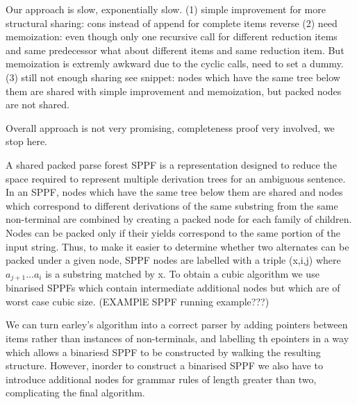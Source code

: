 \begin{isabellebody}
\begin{isamarkuptext}
Our approach is slow, exponentially slow.
(1) simple improvement for more structural sharing: cons instead of append for complete items reverse
(2) need memoization: even though only one recursive call for different reduction items and same
  predecessor what about different items and same reduction item. But memoization is extremly awkward
  due to the cyclic calls, need to set a dummy.
(3) still not enough sharing see snippet: nodes which have the same tree below them are shared with
  simple improvement and memoization, but packed nodes are not shared.

Overall approach is not very promising, completeness proof very involved, we stop here.%
\end{isamarkuptext}\isamarkuptrue%
%
\begin{isamarkuptext}%
A shared packed parse forest SPPF is a representation designed to reduce the space required to represent multiple derivation
trees for an ambiguous sentence. In an SPPF, nodes which have the same tree below them are shared and nodes which correspond
to different derivations of the same substring from the same non-terminal are combined by creating a packed node for each
family of children. Nodes can be packed only if their yields correspond to the same portion of the input string. Thus, to make it easier
to determine whether two alternates can be packed under a given node, SPPF nodes are labelled with a triple (x,i,j) where
$a_{j+1} \dots a_i$ is a substring matched by x. To obtain a cubic algorithm we use binarised SPPFs which contain intermediate additional
nodes but which are of worst case cubic size. (EXAMPlE SPPF running example???)

We can turn earley's algorithm into a correct parser by adding pointers between items rather than instances of non-terminals, and labelling th epointers
in a way which allows a binariesd SPPF to be constructed by walking the resulting structure. However, inorder to
construct a binarised SPPF we also have to introduce additional nodes for grammar rules of length greater than two,
complicating the final algorithm.%
\end{isamarkuptext}\isamarkuptrue%
%
\isadelimtheory
%
\endisadelimtheory
%
\isatagtheory
%
\endisatagtheory
{\isafoldtheory}%
%
\isadelimtheory
%
\endisadelimtheory
%
\end{isabellebody}%
\endinput
